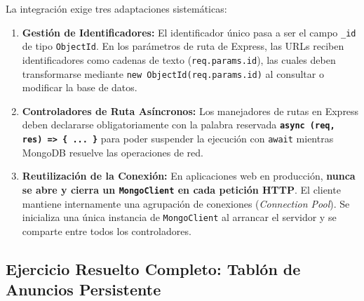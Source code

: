 La integración exige tres adaptaciones sistemáticas:
\begin{enumerate}
    \item \textbf{Gestión de Identificadores:} El identificador único pasa a ser el campo \texttt{\_id} de tipo \texttt{ObjectId}. En los parámetros de ruta de Express, las URLs reciben identificadores como cadenas de texto (\texttt{req.params.id}), las cuales deben transformarse mediante \texttt{new ObjectId(req.params.id)} al consultar o modificar la base de datos.
    \item \textbf{Controladores de Ruta Asíncronos:} Los manejadores de rutas en Express deben declararse obligatoriamente con la palabra reservada \textbf{\texttt{async (req, res) => \{ ... \}}} para poder suspender la ejecución con \texttt{await} mientras MongoDB resuelve las operaciones de red.
    \item \textbf{Reutilización de la Conexión:} En aplicaciones web en producción, \textbf{nunca se abre y cierra un \texttt{MongoClient} en cada petición HTTP}. El cliente mantiene internamente una agrupación de conexiones (\emph{Connection Pool}). Se inicializa una única instancia de \texttt{MongoClient} al arrancar el servidor y se comparte entre todos los controladores.
\end{enumerate}

\subsection{Ejercicio Resuelto Completo: Tablón de Anuncios Persistente}

